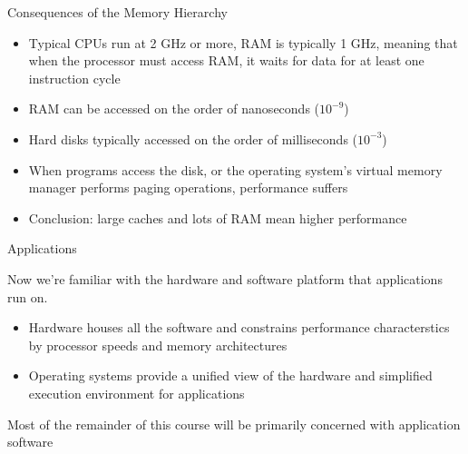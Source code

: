 \documentclass{beamer}
\begin{document}
\begin{frame}{Consequences of the Memory Hierarchy}

\begin{itemize}
\item Typical CPUs run at 2 GHz or more, RAM is typically 1 GHz,
  meaning that when the processor must access RAM, it waits for data
  for at least one instruction cycle
\item RAM can be accessed on the order of nanoseconds ($10^{-9}$)
\item Hard disks typically accessed on the order of milliseconds ($10^{-3}$)
\item When programs access the disk, or the operating system's virtual
  memory manager performs paging operations, performance suffers
\item Conclusion: large caches and lots of RAM mean higher performance
\end{itemize}

\end{frame}

\begin{frame}{Applications}

Now we're familiar with the hardware and software platform that
applications run on.
\begin{itemize}
\item Hardware houses all the software and constrains performance
  characterstics by processor speeds and memory architectures
\item Operating systems provide a unified view of the hardware and
  simplified execution environment for applications
\end{itemize}
Most of the remainder of this course will be primarily concerned with
application software

\end{frame}






\end{document}
